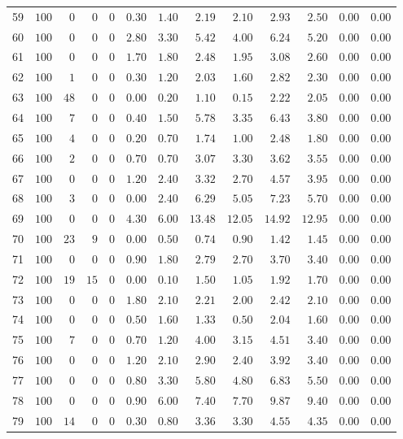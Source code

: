 \documentclass{article}
\begin{document}
\begin{landscape}
\begin{longtable}{lrrrrrrrrrrrr}
59&$100$&$ 0$&$ 0$&$ 0$&$0.30$&$1.40$&$ 2.19$&$ 2.10$&$ 2.93$&$ 2.50$&$0.00$&$0.00$\\
60&$100$&$ 0$&$ 0$&$ 0$&$2.80$&$3.30$&$ 5.42$&$ 4.00$&$ 6.24$&$ 5.20$&$0.00$&$0.00$\\
61&$100$&$ 0$&$ 0$&$ 0$&$1.70$&$1.80$&$ 2.48$&$ 1.95$&$ 3.08$&$ 2.60$&$0.00$&$0.00$\\
62&$100$&$ 1$&$ 0$&$ 0$&$0.30$&$1.20$&$ 2.03$&$ 1.60$&$ 2.82$&$ 2.30$&$0.00$&$0.00$\\
63&$100$&$48$&$ 0$&$ 0$&$0.00$&$0.20$&$ 1.10$&$ 0.15$&$ 2.22$&$ 2.05$&$0.00$&$0.00$\\
64&$100$&$ 7$&$ 0$&$ 0$&$0.40$&$1.50$&$ 5.78$&$ 3.35$&$ 6.43$&$ 3.80$&$0.00$&$0.00$\\
65&$100$&$ 4$&$ 0$&$ 0$&$0.20$&$0.70$&$ 1.74$&$ 1.00$&$ 2.48$&$ 1.80$&$0.00$&$0.00$\\
66&$100$&$ 2$&$ 0$&$ 0$&$0.70$&$0.70$&$ 3.07$&$ 3.30$&$ 3.62$&$ 3.55$&$0.00$&$0.00$\\
67&$100$&$ 0$&$ 0$&$ 0$&$1.20$&$2.40$&$ 3.32$&$ 2.70$&$ 4.57$&$ 3.95$&$0.00$&$0.00$\\
68&$100$&$ 3$&$ 0$&$ 0$&$0.00$&$2.40$&$ 6.29$&$ 5.05$&$ 7.23$&$ 5.70$&$0.00$&$0.00$\\
69&$100$&$ 0$&$ 0$&$ 0$&$4.30$&$6.00$&$13.48$&$12.05$&$14.92$&$12.95$&$0.00$&$0.00$\\
70&$100$&$23$&$ 9$&$ 0$&$0.00$&$0.50$&$ 0.74$&$ 0.90$&$ 1.42$&$ 1.45$&$0.00$&$0.00$\\
71&$100$&$ 0$&$ 0$&$ 0$&$0.90$&$1.80$&$ 2.79$&$ 2.70$&$ 3.70$&$ 3.40$&$0.00$&$0.00$\\
72&$100$&$19$&$15$&$ 0$&$0.00$&$0.10$&$ 1.50$&$ 1.05$&$ 1.92$&$ 1.70$&$0.00$&$0.00$\\
73&$100$&$ 0$&$ 0$&$ 0$&$1.80$&$2.10$&$ 2.21$&$ 2.00$&$ 2.42$&$ 2.10$&$0.00$&$0.00$\\
74&$100$&$ 0$&$ 0$&$ 0$&$0.50$&$1.60$&$ 1.33$&$ 0.50$&$ 2.04$&$ 1.60$&$0.00$&$0.00$\\
75&$100$&$ 7$&$ 0$&$ 0$&$0.70$&$1.20$&$ 4.00$&$ 3.15$&$ 4.51$&$ 3.40$&$0.00$&$0.00$\\
76&$100$&$ 0$&$ 0$&$ 0$&$1.20$&$2.10$&$ 2.90$&$ 2.40$&$ 3.92$&$ 3.40$&$0.00$&$0.00$\\
77&$100$&$ 0$&$ 0$&$ 0$&$0.80$&$3.30$&$ 5.80$&$ 4.80$&$ 6.83$&$ 5.50$&$0.00$&$0.00$\\
78&$100$&$ 0$&$ 0$&$ 0$&$0.90$&$6.00$&$ 7.40$&$ 7.70$&$ 9.87$&$ 9.40$&$0.00$&$0.00$\\
79&$100$&$14$&$ 0$&$ 0$&$0.30$&$0.80$&$ 3.36$&$ 3.30$&$ 4.55$&$ 4.35$&$0.00$&$0.00$\\

\end{longtable}
\end{landscape}
\end{document}
